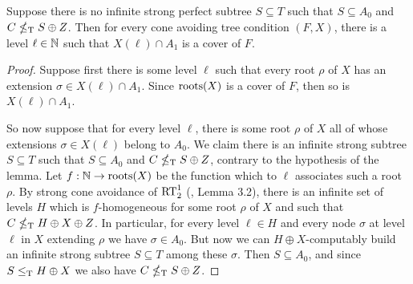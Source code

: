 \begin{lemma}\label{lem:mtt1-sca-existence-colored-cover}
Suppose there is no infinite strong perfect subtree $S \subseteq T$ such that $S \subseteq A_0$ and $C \nleq_{\text{\upshape T}} S \oplus Z$.
Then for every cone avoiding tree condition $(F, X)$, there is a level $\ell \in \mathbb{N}$ such that $X(\ell) \cap A_1$ is a cover of $F$.
\end{lemma}
\begin{proof}
Suppose first there is some level $\ell$ such that every root $\rho$ of $X$ has an extension $\sigma \in X(\ell) \cap A_1$. Since $\operatorname{roots}(X)$ is a cover of $F$, then so is $X(\ell) \cap A_1$.

So now suppose that for every level $\ell$, there is some root $\rho$ of $X$ all of whose extensions $\sigma \in X(\ell)$ belong to $A_0$. We claim there is an infinite strong  subtree $S \subseteq T$ such that $S \subseteq A_0$ and $C \nleq_{\text{\upshape T}} S \oplus Z$, contrary to the hypothesis of the lemma. Let $f: \mathbb{N} \to \operatorname{roots}(X)$ be the function which to $\ell$ associates such a root $\rho$. By strong cone avoidance of $\mathrm{RT}^{1}_{2}$ (\cite{Dzhafarov2009Ramseys}, Lemma 3.2), there is an infinite set of levels $H$ which is $f$-homogeneous for some root $\rho$ of $X$ and such that $C \nleq_{\text{\upshape T}} H \oplus X \oplus Z$. In particular, for every level $\ell \in H$ and every node $\sigma$ at level $\ell$ in $X$ extending $\rho$ we have $\sigma \in A_0$. But now we can $H \oplus X$-computably build an infinite strong subtree $S \subseteq T$ among these $\sigma$. Then $S \subseteq A_0$, and since $S \leq_{\text{\upshape T}} H \oplus X$ we also have $C \nleq_{\text{\upshape T}} S \oplus Z$.
\end{proof}


